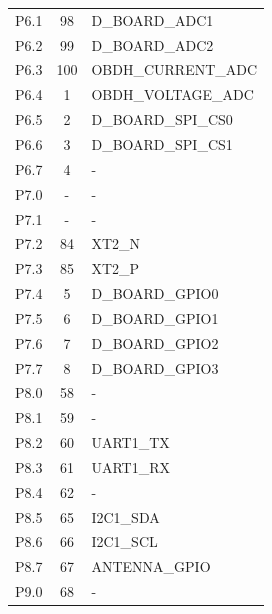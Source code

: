\begin{longtable}{lcl}
    P6.1              & 98                  & D\_BOARD\_ADC1        \\
    P6.2              & 99                  & D\_BOARD\_ADC2        \\
    P6.3              & 100                 & OBDH\_CURRENT\_ADC    \\
    P6.4              & 1                   & OBDH\_VOLTAGE\_ADC    \\
    P6.5              & 2                   & D\_BOARD\_SPI\_CS0    \\
    P6.6              & 3                   & D\_BOARD\_SPI\_CS1    \\
    P6.7              & 4                   & -                     \\
    \midrule
    P7.0              & -                   & -                     \\
    P7.1              & -                   & -                     \\
    P7.2              & 84                  & XT2\_N                \\
    P7.3              & 85                  & XT2\_P                \\
    P7.4              & 5                   & D\_BOARD\_GPIO0       \\
    P7.5              & 6                   & D\_BOARD\_GPIO1       \\
    P7.6              & 7                   & D\_BOARD\_GPIO2       \\
    P7.7              & 8                   & D\_BOARD\_GPIO3       \\
    \midrule
    P8.0              & 58                  & -                     \\
    P8.1              & 59                  & -                     \\
    P8.2              & 60                  & UART1\_TX             \\
    P8.3              & 61                  & UART1\_RX             \\
    P8.4              & 62                  & -                     \\
    P8.5              & 65                  & I2C1\_SDA             \\
    P8.6              & 66                  & I2C1\_SCL             \\
    P8.7              & 67                  & ANTENNA\_GPIO         \\
    \midrule
    P9.0              & 68                  & -                     \\

\end{longtable}
